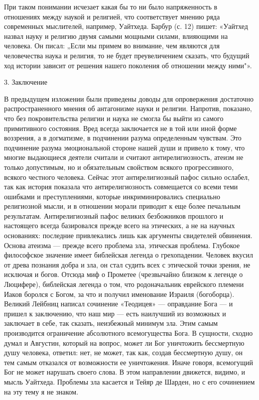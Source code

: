 При  таком понимании  исчезает какая  бы  то ни  было напряженность  в
отношениях  между наукой  и  религией, что  соответствует мнению  ряда
современных  мыслителей, например,  Уайтхеда.  Барбур  (с. 12)  пишет:
«Уайтхед назвал науку и религию двумя самыми мощными силами, влияющими
на человека. Он  писал: „Если мы примем во внимание,  чем являются для
человечества наука и религия, то  не будет преувеличением сказать, что
будущий ход истории  зависит от решения нашего  поколения об отношении
между ними"».

3. Заключение

В  предыдущем   изложении  были  приведены  доводы   для  опровержения
достаточно распространенного  мнения об  антагонизме науки  и религии.
Напротив, показано, что без покровительства  религии и наука не смогла
бы выйти из самого примитивного  состояния. Вред всегда заключается не
в  той  или  иной  форме  воззрения,  а  в  догматизме,  в  подчинении
разума  определенным  чувствам.  Это подчинение  разума  эмоциональной
стороне нашей  души и  привело к тому,  что многие  выдающиеся деятели
считали и  считают антирелигиозность, атеизм не  только допустимым, но
и  обязательным  свойством  всякого прогрессивного,  всякого  честного
человека.  Сейчас  этот  антирелигиозный  пафос  сильно  ослабел,  так
как  история  показала  что  антирелигиозность  совмещается  со  всеми
теми ошибками  и преступлениями, которые  инкриминировались специально
религиозной мысли, и в отношении морали приводит к еще более печальным
результатам.  Антирелигиозный  пафос  великих безбожников  прошлого  и
настоящего  всегда  базировался  прежде   всего  на  этических,  а  не
на  научных  основаниях:  последние привлекались  лишь  как  аргументы
свидетелей обвинения.  Основа атеизма  --- прежде всего  проблема зла,
этическая  проблема. Глубокое  философское  значение имеет  библейская
легенда о грехопадении. Человек вкусил  от древа познания добра и зла,
он стал  судить всех с  этической точки  зрения, не исключая  и богов.
Отсюда  миф о  Прометее (чрезвычайно  близком к  легенде о  Люцифере),
библейская легенда  о том, что родоначальник  еврейского племени Иаков
боролся  с Богом,  за что  и получил  именование Израиля  (богоборца).
Великий Лейбниц написал сочинение «Теодицея» --- оправдание Бога --- и
пришел  к заключению,  что наш  мир  --- есть  наилучший из  возможных
и  заключает  в  себе,  так  сказать,  неизбежный  минимум  зла.  Этим
самым  производится  ограничение  абсолютного  всемогущества  Бога.  В
сущности, сходно  думал и  Августин, который на  вопрос, может  ли Бог
уничтожить бессмертную душу человека, ответил: нет, не может, так как,
создав  бессмертную душу,  он тем  самым отказался  от возможности  ее
уничтожения.  Иначе говоря,  всемогущий Бог  не может  нарушать своего
слова. В этом направлении движется, видимо, и мысль Уайтхеда. Проблемы
зла касается и Тейяр  де Шарден, но с его сочинением на  эту тему я не
знаком.

